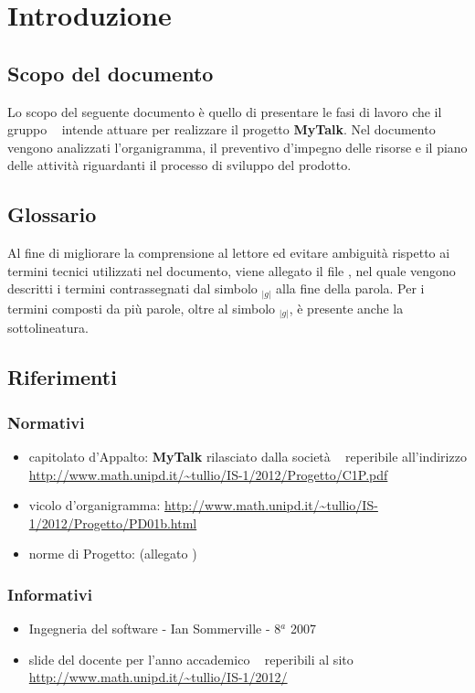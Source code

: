 \section{Introduzione}{

	\subsection{Scopo del documento}{
	Lo scopo del seguente documento è quello di presentare le fasi di lavoro che il gruppo \textit{\ggt~} intende attuare per realizzare il progetto \textbf{MyTalk}.  Nel documento vengono analizzati l'organigramma, il preventivo d'impegno delle risorse e il piano delle attività riguardanti il processo di sviluppo del prodotto.
	
	}
	\subsection{Glossario}{	Al fine di migliorare la comprensione al lettore ed evitare ambiguit\`a rispetto ai termini tecnici utilizzati nel documento, viene allegato il file \emph{\Glossario},  nel quale vengono descritti i termini contrassegnati dal simbolo $_{|g|}$ alla fine della parola.
	Per i termini composti da pi\`u parole, oltre al simbolo $_{|g|}$, \`e presente anche la sottolineatura. }
	\subsection{Riferimenti}{
		\subsubsection{Normativi}{
			\begin{itemize}
				\item[] capitolato d'Appalto: \textbf{MyTalk} rilasciato dalla società \Zucchetti~ reperibile all'indirizzo \url{ http://www.math.unipd.it/~tullio/IS-1/2012/Progetto/C1P.pdf} 
				\item[] vicolo d'organigramma: \url{http://www.math.unipd.it/~tullio/IS-1/2012/Progetto/PD01b.html}
				\item[] norme di Progetto: (allegato \NormeDiProgetto)
			\end{itemize}					
		}
		\subsubsection{Informativi}{
		\begin{itemize}
		\item[] Ingegneria del software - Ian Sommerville - 8$^a$ 2007 
		\item[] slide del docente per l'anno accademico \uniAA~ reperibili al sito \url{http://www.math.unipd.it/~tullio/IS-1/2012/}
		\end{itemize}
						
}}}
